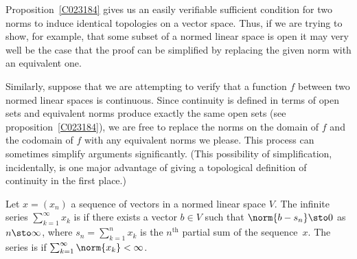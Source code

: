 Proposition~\ref{C023184} gives us an easily verifiable sufficient condition for two norms
to induce identical topologies on a vector space.  Thus, if we are trying to show, for
example, that some subset of a normed linear space is open it may very well be the case
that the proof can be simplified by replacing the given norm with an equivalent one.

Similarly, suppose that we are attempting to verify that a function $f$ between two
normed linear spaces is continuous.  Since continuity is defined in terms of open sets
and equivalent norms produce exactly the same open sets (see proposition~\ref{C023184}),
we are free to replace the norms on the domain of $f$ and the codomain of $f$ with any
equivalent norms we please.  This process can sometimes simplify arguments significantly.
(This possibility of simplification, incidentally, is one major advantage of giving a
topological definition of continuity in the first place.)

\begin{defn}\label{C02319} Let $x = (x_n)$ a sequence of vectors in a normed linear space $V$.
The infinite series $\sum_{k=1}^\infty x_k$ is
 if there exists a vector $b \in V$ such that $\norm{b - s_n} \sto 0$ as $n
\sto \infty$, where $s_n = \sum_{k=1}^n x_k$ is the $n^{\text{th}}$ partial sum of the
sequence~$x$.  The series is
 if $\sum_{k=1}^\infty \norm{x_k} < \infty$.
\end{defn}

